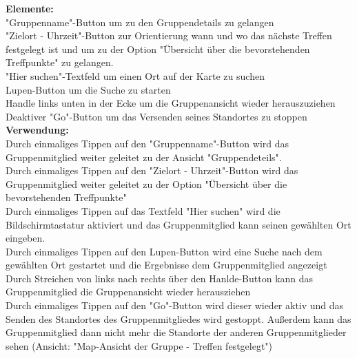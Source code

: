 \textbf{Elemente:}\\
"Gruppenname"-Button um zu den Gruppendetails zu gelangen\\
"Zielort - Uhrzeit"-Button zur Orientierung wann und wo das nächste Treffen festgelegt ist und um zu der Option "Übersicht über die bevorstehenden Treffpunkte" zu gelangen.\\
"Hier suchen"-Textfeld um einen Ort auf der Karte zu suchen\\
Lupen-Button um die Suche zu starten\\
Handle links unten in der Ecke um die Gruppenansicht wieder herauszuziehen\\
Deaktiver "Go"-Button um das Versenden seines Standortes zu stoppen\\
\textbf{Verwendung:}\\
Durch einmaliges Tippen auf den "Gruppenname"-Button wird das Gruppenmitglied weiter geleitet zu der Ansicht "Gruppendeteils".\\
Durch einmaliges Tippen auf den "Zielort - Uhrzeit"-Button wird das Gruppenmitglied weiter geleitet zu der Option "Übersicht über die bevorstehenden Treffpunkte"\\
Durch einmaliges Tippen auf das Textfeld "Hier suchen" wird die Bildschirmtastatur aktiviert und das Gruppenmitglied kann seinen gewählten Ort eingeben.\\
Durch einmaliges Tippen auf den Lupen-Button wird eine Suche nach dem gewählten Ort gestartet und die Ergebnisse dem Gruppenmitglied angezeigt\\
Durch Streichen von links nach rechts über den Hanlde-Button kann das Gruppenmitglied die Gruppenansicht wieder herausziehen\\
Durch einmaliges Tippen auf den "Go"-Button wird dieser wieder aktiv und das Senden des Standortes des Gruppenmitgliedes wird gestoppt. Außerdem kann das Gruppenmitglied dann nicht mehr die Standorte der anderen Gruppenmitglieder sehen (Ansicht: "Map-Ansicht der Gruppe - Treffen festgelegt")\\ \\
